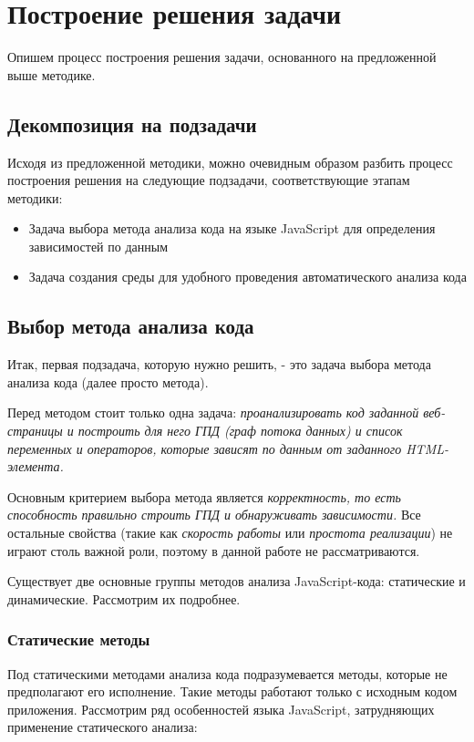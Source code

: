 
\chapter{Построение решения задачи}\label{Solution}
Опишем процесс построения решения задачи, основанного на предложенной выше методике.

\section{Декомпозиция на подзадачи}
Исходя из предложенной методики, можно очевидным образом разбить процесс построения решения на следующие подзадачи, соответствующие этапам методики:

\begin{itemize}
	\item Задача выбора метода анализа кода на языке JavaScript для определения зависимостей по данным
	\item Задача создания среды для удобного проведения автоматического анализа кода
\end{itemize}

\section{Выбор метода анализа кода}

Итак, первая подзадача, которую нужно решить, - это задача выбора метода анализа кода (далее просто метода). 

\bigskip
Перед методом стоит только одна задача: \textit{проанализировать код заданной веб-страницы и построить для него ГПД (граф потока данных) и список переменных и операторов, которые зависят по данным от заданного HTML-элемента.}

\bigskip
Основным критерием выбора метода является \textit{корректность, то есть способность правильно строить ГПД и обнаруживать зависимости.} Все остальные свойства (такие как \textit{скорость работы} или \textit{простота реализации}) не играют столь важной роли, поэтому в данной работе не рассматриваются.

\bigskip
Существует две основные группы методов анализа JavaScript-кода: статические и динамические. Рассмотрим их подробнее.

\subsection{Статические методы}
	Под статическими методами анализа кода подразумевается методы, которые не предполагают его исполнение. Такие методы работают только с исходным кодом приложения. Рассмотрим ряд особенностей языка JavaScript, затрудняющих применение статического анализа:

